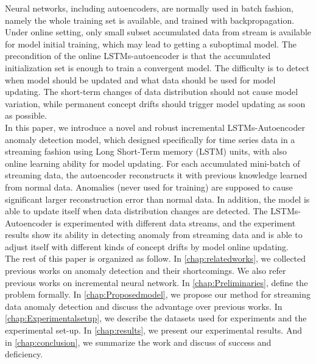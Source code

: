 Neural networks, including autoencoders, are normally used in batch fashion, namely the whole training set is available, and trained with backpropagation. Under online setting, only small subset accumulated data from stream is available for model initial training, which may lead to getting a suboptimal model. The precondition of the online LSTMs-autoencoder is that the accumulated initialization set is enough to train a convergent model. The difficulty is to detect when model should be updated and what data should be used for model updating. The short-term changes of data distribution should not cause model variation, while permanent concept drifts should trigger model updating as soon as possible.\\

In this paper, we introduce a novel and robust incremental LSTMs-Autoencoder anomaly detection model, which designed specifically for time series data in a streaming fashion using Long Short-Term memory (LSTM) units, with also online learning ability for model updating. For each accumulated mini-batch of streaming data, the autoencoder reconstructs it with previous knowledge learned from normal data. Anomalies (never used for training) are supposed to cause significant larger reconstruction error than normal data. In addition, the model is able to update itself when data distribution changes are detected. The LSTMs-Autoencoder is experimented with different data streams, and the experiment results show its ability in detecting anomaly from streaming data and is able to adjust itself with different kinds of concept drifts by model online updating.\\


The rest of this paper is organized as follow. In \autoref{chap:relatedworks}, we collected previous works on anomaly detection and their shortcomings. We also refer previous works on incremental neural network. In \autoref{chap:Preliminaries}, define the problem formally. In \autoref{chap:Proposedmodel}, we propose our method for streaming data anomaly detection and discuss the advantage over previous works. In \autoref{chap:Experimentalsetup}, we describe the datasets used for experiments and the experimental set-up. In \autoref{chap:results}, we present our experimental results. And in \autoref{chap:conclusion}, we summarize the work and discuss of success and deficiency.

